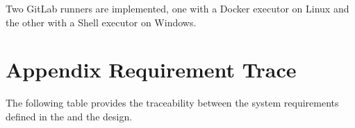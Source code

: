 \documentclass[a4paper,10pt,english]{sphinxmanual}
\begin{document}
\sphinxAtStartPar
Two GitLab runners are implemented, one with a Docker executor on Linux and the other with a Shell executor on Windows.

\sphinxAtStartPar
{}


\chapter{Appendix \sphinxhyphen{} Requirement Trace}
\label{\detokenize{a_requirement_trace:appendix-requirement-trace}}\label{\detokenize{a_requirement_trace:requirement-trace}}\label{\detokenize{a_requirement_trace::doc}}
\sphinxAtStartPar
The following table provides the traceability between the system requirements defined in the
{\hyperref[\detokenize{introduction:fcidecomp-wpd}]{}} and the design.

\sphinxAtStartPar
{}

\sphinxAtStartPar
{}

\sphinxAtStartPar
{}
\end{document}
